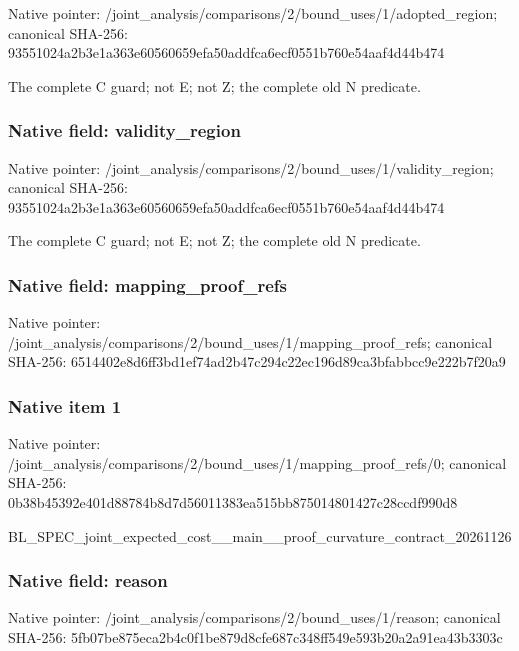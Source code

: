\documentclass[10pt,a4paper]{article}
\begin{document}
Native pointer: /joint\_analysis/comparis\allowbreak{}ons/2/bound\_uses/1/adopt\allowbreak{}ed\_region; canonical SHA-256: 93551024a2b3e1a363e60560\allowbreak{}659efa50addfca6ecf0551b7\allowbreak{}60e54aaf4d44b474


The complete C guard; not E; not Z; the complete old N predicate.


\subsubsection{Native field: validity\_region}


Native pointer: /joint\_analysis/comparis\allowbreak{}ons/2/bound\_uses/1/valid\allowbreak{}ity\_region; canonical SHA-256: 93551024a2b3e1a363e60560\allowbreak{}659efa50addfca6ecf0551b7\allowbreak{}60e54aaf4d44b474


The complete C guard; not E; not Z; the complete old N predicate.


\subsubsection{Native field: mapping\_proof\_refs}


Native pointer: /joint\_analysis/comparis\allowbreak{}ons/2/bound\_uses/1/mappi\allowbreak{}ng\_proof\_refs; canonical SHA-256: 6514402e8d6ff3bd1ef74ad2\allowbreak{}b47c294c22ec196d89ca3bfa\allowbreak{}bbcc9e222b7f20a9



\subsubsection{Native item 1}


Native pointer: /joint\_analysis/comparis\allowbreak{}ons/2/bound\_uses/1/mappi\allowbreak{}ng\_proof\_refs/0; canonical SHA-256: 0b38b45392e401d88784b8d7\allowbreak{}d56011383ea515bb87501480\allowbreak{}1427c28ccdf990d8


BL\_SPEC\_joint\_expected\_c\allowbreak{}ost\_\_main\_\_proof\_curvatu\allowbreak{}re\_contract\_20261126


\subsubsection{Native field: reason}


Native pointer: /joint\_analysis/comparis\allowbreak{}ons/2/bound\_uses/1/reaso\allowbreak{}n; canonical SHA-256: 5fb07be875eca2b4c0f1be87\allowbreak{}9d8cfe687c348ff549e593b2\allowbreak{}0a2a91ea43b3303c
\end{document}
